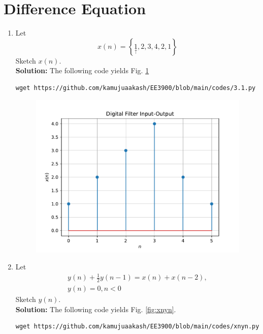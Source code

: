 \documentclass[journal,12pt,twocolumn]{IEEEtran}
\newcommand{\solution}{\noindent \textbf{Solution: }}
\providecommand{\cbrak}[1]{\ensuremath{\left\{#1\right\}}}
\numberwithin{equation}{section}
\renewcommand\thesection{\arabic{section}}
\begin{document}
\section{Difference Equation}
\begin{enumerate}[label=\thesection.\arabic*,ref=\thesection.\theenumi]
\item Let
\begin{equation}
x(n) = \cbrak{\underset{\uparrow}{1},2,3,4,2,1}
\end{equation}
Sketch $x(n)$.
\\
\solution The following code yields Fig. \ref{fig:3.1}
\begin{lstlisting}
wget https://github.com/kamujuaakash/EE3900/blob/main/codes/3.1.py
\end{lstlisting}
\begin{figure}[!ht]
\begin{center}
\includegraphics[width=\columnwidth]{./figs/3.1}
\end{center}
\label{fig:3.1}	
\end{figure}
\item Let
\begin{multline}
\label{eq:iir_filter}
y(n) + \frac{1}{2}y(n-1) = x(n) + x(n-2), 
\\
 y(n) = 0, n < 0
\end{multline}
Sketch $y(n)$.
\\
\solution The following code yields Fig. \ref{fig:xnyn}.
\begin{lstlisting}
wget https://github.com/kamujuaakash/EE3900/blob/main/codes/xnyn.py
\end{lstlisting}

\end{enumerate}
\end{document}
